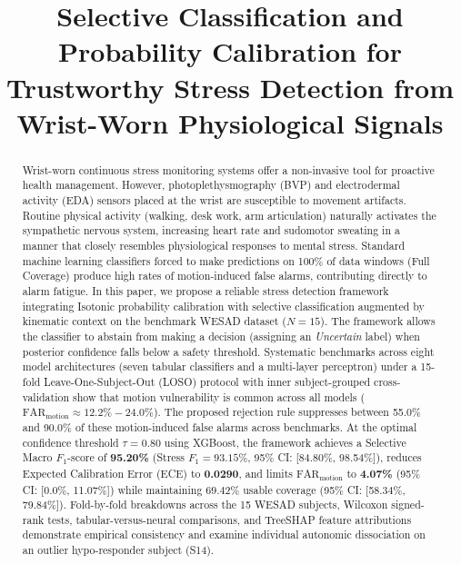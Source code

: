 \documentclass[conference]{IEEEtran}
\begin{document}
\title{Selective Classification and Probability Calibration for Trustworthy Stress Detection from Wrist-Worn Physiological Signals}

\author{
}

\maketitle

\begin{abstract}
Wrist-worn continuous stress monitoring systems offer a non-invasive tool for proactive health management. However, photoplethysmography (BVP) and electrodermal activity (EDA) sensors placed at the wrist are susceptible to movement artifacts. Routine physical activity (walking, desk work, arm articulation) naturally activates the sympathetic nervous system, increasing heart rate and sudomotor sweating in a manner that closely resembles physiological responses to mental stress. Standard machine learning classifiers forced to make predictions on 100\% of data windows (Full Coverage) produce high rates of motion-induced false alarms, contributing directly to alarm fatigue. In this paper, we propose a reliable stress detection framework integrating Isotonic probability calibration with selective classification augmented by kinematic context on the benchmark WESAD dataset ($N=15$). The framework allows the classifier to abstain from making a decision (assigning an \textit{Uncertain} label) when posterior confidence falls below a safety threshold. Systematic benchmarks across eight model architectures (seven tabular classifiers and a multi-layer perceptron) under a 15-fold Leave-One-Subject-Out (LOSO) protocol with inner subject-grouped cross-validation show that motion vulnerability is common across all models ($\text{FAR}_{\text{motion}} \approx 12.2\% - 24.0\%$). The proposed rejection rule suppresses between 55.0\% and 90.0\% of these motion-induced false alarms across benchmarks. At the optimal confidence threshold $\tau = 0.80$ using XGBoost, the framework achieves a Selective Macro $F_1$-score of \textbf{95.20\%} (Stress $F_1 = 93.15\%$, 95\% CI: [84.80\%, 98.54\%]), reduces Expected Calibration Error (ECE) to \textbf{0.0290}, and limits $\text{FAR}_{\text{motion}}$ to \textbf{4.07\%} (95\% CI: [0.0\%, 11.07\%]) while maintaining $69.42\%$ usable coverage (95\% CI: [58.34\%, 79.84\%]). Fold-by-fold breakdowns across the 15 WESAD subjects, Wilcoxon signed-rank tests, tabular-versus-neural comparisons, and TreeSHAP feature attributions demonstrate empirical consistency and examine individual autonomic dissociation on an outlier hypo-responder subject (S14).
\end{abstract}
\end{document}
